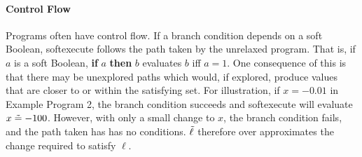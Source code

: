 \paragraph{Control Flow}
Programs often have control flow.
If a branch condition depends on a soft Boolean, softexecute follows the path taken by the unrelaxed program.  That is, if $a$ is a soft Boolean, \textbf{if} $a$ \textbf{then} $b$ evaluates $b$ iff $a = 1$.
One consequence of this is that there may be unexplored paths which would, if explored, produce values that are closer to or within the satisfying set.
For illustration, if $x = -0.01$ in Example Program 2,
 the branch condition succeeds and \textrm{softexecute} will evaluate $x \mathrel{\tilde{=}} -100$. However, with only a small change to $x$, the branch condition fails, and the path taken has has no conditions.
 $\tilde{\ell}$ therefore over approximates the change required to satisfy $\ell$.






